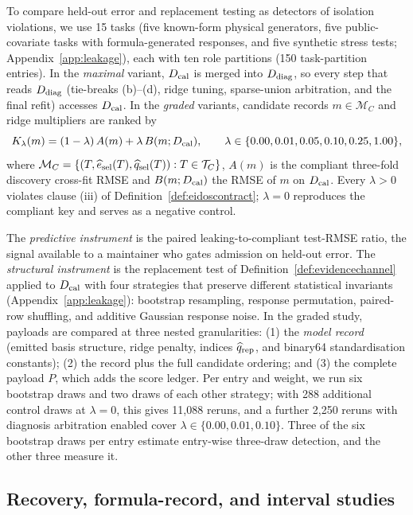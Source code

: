 To compare held-out error and replacement testing as detectors of isolation violations, we use 15 tasks (five known-form physical generators, five public-covariate tasks with formula-generated responses, and five synthetic stress tests; Appendix~\ref{app:leakage}), each with ten role partitions (150 task-partition entries). In the \emph{maximal} variant, \(D_{\rm cal}\) is merged into \(D_{\rm diag}\), so every step that reads \(D_{\rm diag}\) (tie-breaks (b)--(d), ridge tuning, sparse-union arbitration, and the final refit) accesses \(D_{\rm cal}\). In the \emph{graded} variants, candidate records \(m\in\mathcal M_C\) and ridge multipliers are ranked by
\begin{equation}\label{eq:gradedkey}
K_\lambda(m)=(1-\lambda)\,A(m)+\lambda\,B(m;D_{\rm cal}),\qquad \lambda\in\{0.00,0.01,0.05,0.10,0.25,1.00\},
\end{equation}
where \(\mathcal M_C=\{(T,\widehat e_{\rm sel}(T),\widehat q_{\rm sel}(T)):T\in\mathcal T_C\}\), \(A(m)\) is the compliant three-fold discovery cross-fit RMSE and \(B(m;D_{\rm cal})\) the RMSE of \(m\) on \(D_{\rm cal}\). Every \(\lambda>0\) violates clause (iii) of Definition~\ref{def:eidoscontract}; \(\lambda=0\) reproduces the compliant key and serves as a negative control.

The \emph{predictive instrument} is the paired leaking-to-compliant test-RMSE ratio, the signal available to a maintainer who gates admission on held-out error. The \emph{structural instrument} is the replacement test of Definition~\ref{def:evidencechannel} applied to \(D_{\rm cal}\) with four strategies that preserve different statistical invariants (Appendix~\ref{app:leakage}): bootstrap resampling, response permutation, paired-row shuffling, and additive Gaussian response noise. In the graded study, payloads are compared at three nested granularities: (1) the \emph{model record} (emitted basis structure, ridge penalty, indices \(\widehat q_{\rm rep}\), and binary64 standardisation constants); (2) the record plus the full candidate ordering; and (3) the complete payload \(P\), which adds the score ledger. Per entry and weight, we run six bootstrap draws and two draws of each other strategy; with 288 additional control draws at \(\lambda=0\), this gives 11{,}088 reruns, and a further 2{,}250 reruns with diagnosis arbitration enabled cover \(\lambda\in\{0.00,0.01,0.10\}\). Three of the six bootstrap draws per entry estimate entry-wise three-draw detection, and the other three measure it.

\subsection{Recovery, formula-record, and interval studies}\label{sec:recoverydesign}


